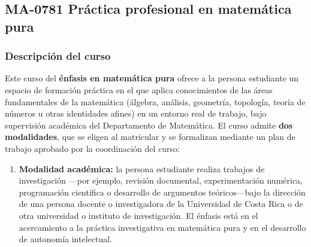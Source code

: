\newpage
\subsection*{MA-0781 Práctica profesional en matemática pura}

\hypertarget{MA0781Pura}{}
\begin{refsection}
\begin{table}[H]
\end{table}

\subsubsection*{Descripción del curso}

Este curso del \textbf{énfasis en matemática pura} ofrece a la persona estudiante un espacio de formación práctica en el que aplica conocimientos de las áreas fundamentales de la matemática (álgebra, análisis, geometría, topología, teoría de números u otras identidades afines) en un entorno real de trabajo, bajo supervisión académica del Departamento de Matemática. El curso admite \textbf{dos modalidades}, que se eligen al matricular y se formalizan mediante un plan de trabajo aprobado por la coordinación del curso:

\begin{enumerate}
\item \textbf{Modalidad académica:} la persona estudiante realiza trabajos de investigación ---por ejemplo, revisión documental, experimentación numérica, programación científica o desarrollo de argumentos teóricos---bajo la dirección de una persona docente o investigadora de la Universidad de Costa Rica o de otra universidad o instituto de investigación. El énfasis está en el acercamiento a la práctica investigativa en matemática pura y en el desarrollo de autonomía intelectual.


\end{enumerate}
\end{refsection}
